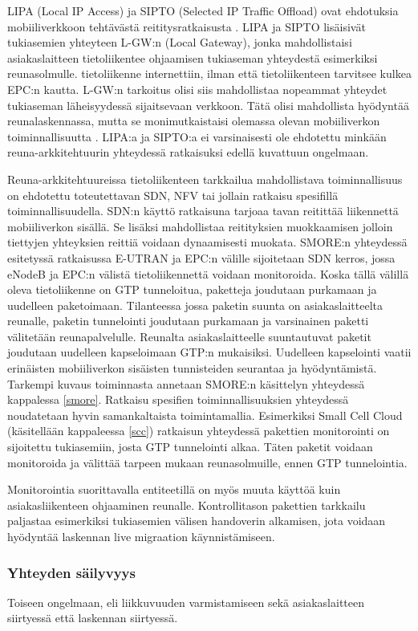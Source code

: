 LIPA (Local IP Access) ja SIPTO (Selected IP Traffic Offload) ovat ehdotuksia mobiiliverkkoon tehtävästä reititysratkaisusta \cite{samdanis2012traffic,3gpplipa}.
LIPA ja SIPTO lisäisivät tukiasemien yhteyteen L-GW:n (Local Gateway), jonka mahdollistaisi asiakaslaitteen tietoliikentee ohjaamisen tukiaseman yhteydestä esimerkiksi reunasolmulle. tietoliikenne internettiin, ilman että tietoliikenteen tarvitsee kulkea EPC:n kautta. 
L-GW:n tarkoitus olisi siis mahdollistaa nopeammat yhteydet tukiaseman läheisyydessä sijaitsevaan verkkoon. Tätä olisi mahdollista hyödyntää reunalaskennassa, mutta se monimutkaistaisi olemassa olevan mobiiliverkon toiminnallisuutta \cite{cho2014smore}.
LIPA:a ja SIPTO:a ei varsinaisesti ole ehdotettu minkään reuna-arkkitehtuurin yhteydessä ratkaisuksi edellä kuvattuun ongelmaan. 

Reuna-arkkitehtuureissa tietoliikenteen tarkkailua mahdollistava toiminnallisuus on ehdotettu toteutettavan SDN, NFV tai jollain ratkaisu spesifillä toiminnallisuudella. 
SDN:n käyttö ratkaisuna tarjoaa tavan reitittää liikennettä mobiiliverkon sisällä. Se lisäksi mahdollistaa reitityksien muokkaamisen jolloin tiettyjen yhteyksien reittiä voidaan dynaamisesti muokata. SMORE:n yhteydessä esitetyssä ratkaisussa  E-UTRAN ja EPC:n välille sijoitetaan SDN kerros, jossa eNodeB ja EPC:n välistä tietoliikennettä voidaan monitoroida. 
Koska tällä välillä oleva tietoliikenne on GTP tunneloitua, paketteja joudutaan purkamaan ja uudelleen paketoimaan. 
Tilanteessa jossa paketin suunta on asiakaslaitteelta reunalle, paketin tunnelointi joudutaan purkamaan ja varsinainen paketti välitetään reunapalvelulle. 
Reunalta asiakaslaitteelle suuntautuvat paketit joudutaan uudelleen kapseloimaan GTP:n mukaisiksi.
Uudelleen kapselointi vaatii erinäisten mobiiliverkon sisäisten tunnisteiden seurantaa ja hyödyntämistä.
Tarkempi kuvaus toiminnasta annetaan SMORE:n käsittelyn yhteydessä kappalessa \ref{smore}.
Ratkaisu spesifien toiminnallisuuksien yhteydessä noudatetaan hyvin samankaltaista toimintamallia. Esimerkiksi Small Cell Cloud (käsitellään kappaleessa \ref{scc}) ratkaisun yhteydessä pakettien monitorointi on sijoitettu tukiasemiin, josta GTP tunnelointi alkaa. Täten paketit voidaan monitoroida ja välittää tarpeen mukaan reunasolmuille, ennen GTP tunnelointia.

Monitorointia suorittavalla entiteetillä on myös muuta käyttöä kuin asiakasliikenteen ohjaaminen reunalle. Kontrollitason pakettien tarkkailu paljastaa esimerkiksi tukiasemien välisen handoverin alkamisen, jota voidaan hyödyntää laskennan live migraation käynnistämiseen.

\subsubsection*{Yhteyden säilyvyys}


Toiseen ongelmaan, eli liikkuvuuden varmistamiseen sekä asiakaslaitteen siirtyessä että laskennan siirtyessä.





